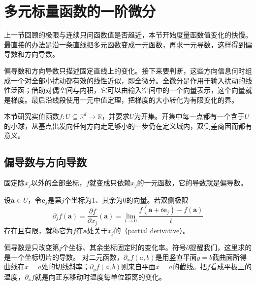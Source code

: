 \section{多元标量函数的一阶微分}
\label{sec:multivariable-scalar-first-order}

上一节回顾的极限与连续只问函数值是否趋近，本节开始度量函数值变化的快慢。最直接的办法是沿一条直线把多元函数变成一元函数，再求一元导数，这样得到偏导数和方向导数。

偏导数和方向导数只描述固定直线上的变化。接下来要判断，这些方向信息何时组成一个对全部小扰动都有效的线性近似，即全微分。全微分是作用于输入扰动的线性泛函；借助对偶空间与内积，它可以由输入空间中的一个向量表示，这个向量就是梯度。最后沿线段使用一元中值定理，把梯度的大小转化为有限变化的界。

本节研究实值函数$f:U\subseteq\mathbb R^d\to\mathbb R$，并要求$U$为开集。开集中每一点都有一个含于$U$的小球，从基点出发向任何方向走足够小的一步仍在定义域内，双侧差商因而都有意义。

\subsection{偏导数与方向导数}

固定除$x_j$以外的全部坐标，$f$就变成只依赖$x_j$的一元函数，它的导数就是偏导数。
\begin{definition}[偏导数]
\label{def:multivariable-partial-derivative}
设$\bm a\in U$，令$\bm e_j$是第$j$个坐标为$1$、其余为$0$的向量。若双侧极限
\begin{equation}
 \partial_jf(\bm a)=\frac{\partial f}{\partial x_j}(\bm a)
 =\lim_{t\to0}\frac{f(\bm a+t\bm e_j)-f(\bm a)}t
\label{eq:multivariable-partial-derivative}
\end{equation}
存在且有限，就称它为$f$在$\bm a$处关于$x_j$的（partial derivative）。
\end{definition}
偏导数是只改变第$j$个坐标、其余坐标固定时的变化率。符号$\partial$提醒我们，这里求的是一个坐标切片的导数。
对二元函数，$\partial_xf(a,b)$是用竖直平面$y=b$截曲面所得曲线在$x=a$处的切线斜率；$\partial_yf(a,b)$则来自平面$x=a$的截线。把$f$看成平板上的温度，$\partial_xf$就是向正东移动时温度每单位距离的变化。

